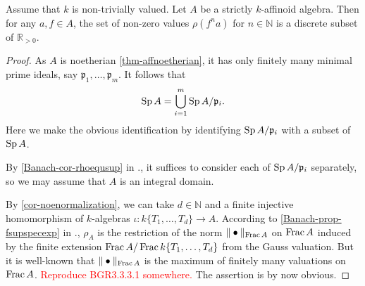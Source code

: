 \begin{lemma}\label{prop-rhodiscrete}
    Assume that $k$ is non-trivially valued.
    Let $A$ be a strictly $k$-affinoid algebra. Then for any $a,f\in A$, the set of non-zero values $\rho(f^n a)$ for $n\in \mathbb{N}$ is a discrete subset of $\mathbb{R}_{>0}$.
\end{lemma}
\begin{proof}
    As $A$ is noetherian \cref{thm-affnoetherian}, it has only finitely many minimal prime ideals, say $\mathfrak{p}_1,\ldots,\mathfrak{p}_m$. It follows that 
    \[
        \operatorname{Sp} A=\bigcup_{i=1}^m \operatorname{Sp} A/\mathfrak{p}_i.
    \]
    Here we make the obvious identification by identifying $\operatorname{Sp} A/\mathfrak{p}_i$ with a subset of $\operatorname{Sp} A$.

    By \cref{Banach-cor-rhoequsup} in ., it suffices to consider each of $\operatorname{Sp} A/\mathfrak{p}_i$ separately, so we may assume that $A$ is an integral domain. 
    
    By \cref{cor-noenormalization}, we can take $d\in \mathbb{N}$ and a finite injective homomorphism of $k$-algebras $\iota:k\{T_1,\ldots,T_d\}\rightarrow A$. According to \cref{Banach-prop-fsupspecexp} in ., $\rho_A$ is the restriction of the norm $\|\bullet\|_{\operatorname{Frac} A}$ on $\operatorname{Frac} A$ induced by the finite extension $\operatorname{Frac} A/\operatorname{Frac} k\{T_1,\ldots,T_d\}$ from the Gauss valuation. But it is well-known that $\|\bullet\|_{\operatorname{Frac} A}$ is the maximum of finitely many valuations on $\operatorname{Frac} A$. \textcolor{red}{Reproduce BGR3.3.3.1 somewhere.} The assertion is by now obvious.
\end{proof}

